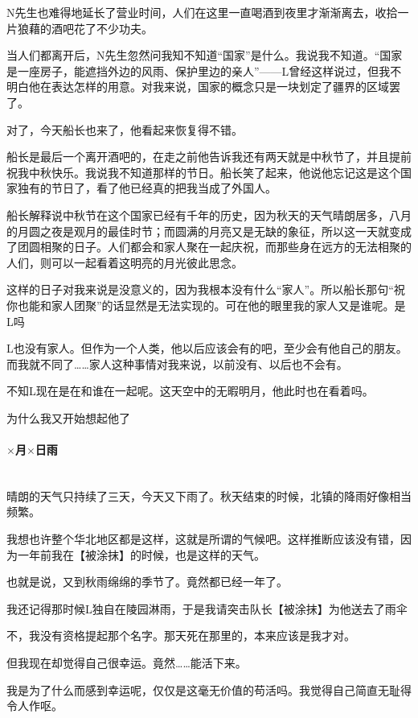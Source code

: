 N先生也难得地延长了营业时间，人们在这里一直喝酒到夜里才渐渐离去，收拾一片狼藉的酒吧花了不少功夫。

当人们都离开后，N先生忽然问我知不知道“国家”是什么。我说我不知道。“国家是一座房子，能遮挡外边的风雨、保护里边的亲人”——L曾经这样说过，但我不明白他在表达怎样的用意。对我来说，国家的概念只是一块划定了疆界的区域罢了。

对了，今天船长也来了，他看起来恢复得不错。

船长是最后一个离开酒吧的，在走之前他告诉我还有两天就是中秋节了，并且提前祝我中秋快乐。我说我不知道那样的节日。船长笑了起来，他说他忘记这是这个国家独有的节日了，看了他已经真的把我当成了外国人。

船长解释说中秋节在这个国家已经有千年的历史，因为秋天的天气晴朗居多，八月的月圆之夜是观月的最佳时节；而圆满的月亮又是无缺的象征，所以这一天就变成了团圆相聚的日子。人们都会和家人聚在一起庆祝，而那些身在远方的无法相聚的人们，则可以一起看着这明亮的月光彼此思念。

这样的日子对我来说是没意义的，因为我根本没有什么“家人”。所以船长那句“祝你也能和家人团聚”的话显然是无法实现的。可在他的眼里我的家人又是谁呢。是L吗

L也没有家人。但作为一个人类，他以后应该会有的吧，至少会有他自己的朋友。而我就不同了……家人这种事情对我来说，以前没有、以后也不会有。

不知L现在是在和谁在一起呢。这天空中的无暇明月，他此时也在看着吗。

为什么我又开始想起他了

\par

\paragraph*{$\times$月$\times$日\quad 雨}\mbox{}\\

晴朗的天气只持续了三天，今天又下雨了。秋天结束的时候，北镇的降雨好像相当频繁。

我想也许整个华北地区都是这样，这就是所谓的气候吧。这样推断应该没有错，因为一年前我在【被涂抹】的时候，也是这样的天气。

也就是说，又到秋雨绵绵的季节了。竟然都已经一年了。

我还记得那时候L独自在陵园淋雨，于是我请突击队长【被涂抹】为他送去了雨伞

不，我没有资格提起那个名字。那天死在那里的，本来应该是我才对。

但我现在却觉得自己很幸运。竟然……能活下来。

我是为了什么而感到幸运呢，仅仅是这毫无价值的苟活吗。我觉得自己简直无耻得令人作呕。

